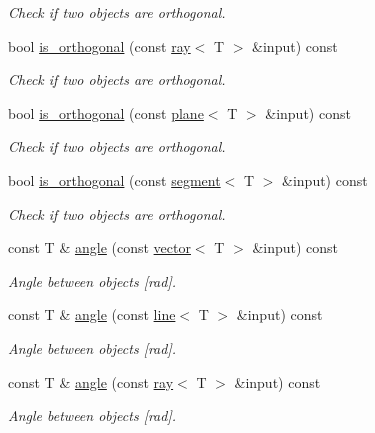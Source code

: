 \begin{DoxyCompactItemize}
\begin{DoxyCompactList}\small\item\em Check if two objects are orthogonal. \end{DoxyCompactList}\item 
bool \hyperlink{classddd_1_1plane_ab2e96b3fc7db8468a01f487f0a03fbf5}{is\+\_\+orthogonal} (const \hyperlink{classddd_1_1ray}{ray}$<$ T $>$ \&input) const
\begin{DoxyCompactList}\small\item\em Check if two objects are orthogonal. \end{DoxyCompactList}\item 
bool \hyperlink{classddd_1_1plane_a385d3ae184ada014ea95e8139a0995d0}{is\+\_\+orthogonal} (const \hyperlink{classddd_1_1plane}{plane}$<$ T $>$ \&input) const
\begin{DoxyCompactList}\small\item\em Check if two objects are orthogonal. \end{DoxyCompactList}\item 
bool \hyperlink{classddd_1_1plane_a110e20cb229dd24588557dcc96b2d099}{is\+\_\+orthogonal} (const \hyperlink{classddd_1_1segment}{segment}$<$ T $>$ \&input) const
\begin{DoxyCompactList}\small\item\em Check if two objects are orthogonal. \end{DoxyCompactList}\item 
const T \& \hyperlink{classddd_1_1plane_a07f91cce7fe6dc942c62311e4dfa10d9}{angle} (const \hyperlink{classddd_1_1vector}{vector}$<$ T $>$ \&input) const
\begin{DoxyCompactList}\small\item\em Angle between objects \mbox{[}rad\mbox{]}. \end{DoxyCompactList}\item 
const T \& \hyperlink{classddd_1_1plane_a5107cac34cbae7ff286f0b0e9a90c940}{angle} (const \hyperlink{classddd_1_1line}{line}$<$ T $>$ \&input) const
\begin{DoxyCompactList}\small\item\em Angle between objects \mbox{[}rad\mbox{]}. \end{DoxyCompactList}\item 
const T \& \hyperlink{classddd_1_1plane_a4e472e461308a96438c26b73b9338593}{angle} (const \hyperlink{classddd_1_1ray}{ray}$<$ T $>$ \&input) const
\begin{DoxyCompactList}\small\item\em Angle between objects \mbox{[}rad\mbox{]}. \end{DoxyCompactList}\item 

\end{DoxyCompactItemize}
